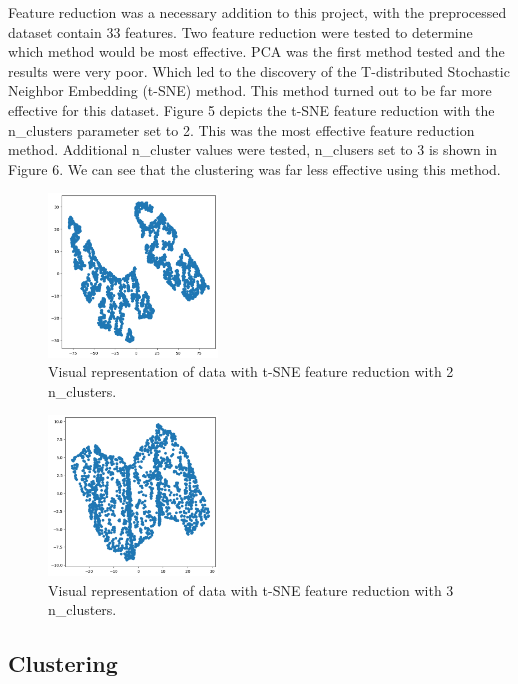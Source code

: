 \documentclass[twocolumn]{article}
\begin{document}
Feature reduction was a necessary addition to this project, with the preprocessed dataset contain 33 features. Two feature reduction were tested to determine which method would be most effective. PCA was the first method tested and the results were very poor. Which led to the discovery of the T-distributed Stochastic Neighbor Embedding (t-SNE) method. This method turned out to be far more effective for this dataset. Figure 5 depicts the t-SNE feature reduction with the n\_clusters parameter set to 2. This was the most effective feature reduction method. Additional n\_cluster values were tested, n\_clusers set to 3 is shown in Figure 6. We can see that the clustering was far less effective using this method.

\begin{figure}[H]
    \centering
    \includegraphics[width=0.4\textwidth]{images/tsne_2.png}
    \caption{Visual representation of data with t-SNE feature reduction with 2 n\_clusters.}
\end{figure}



\begin{figure}[H]
    \centering
    \includegraphics[width=0.4\textwidth]{images/tsne_3.png}
    \caption{Visual representation of data with t-SNE feature reduction with 3 n\_clusters.}
\end{figure}

\subsection{Clustering}
\end{document}
